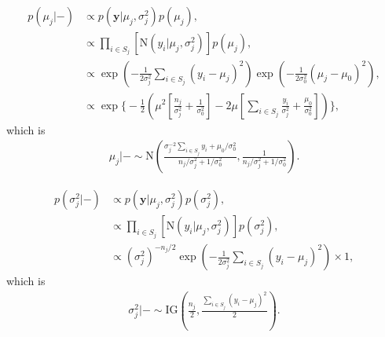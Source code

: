 \documentclass{article}
\begin{document}
\begin{align}
    p(\mu_{j}| - ) & \propto p(\textbf{y}| \mu_{j}, \sigma^{2}_{j}) p(\mu_{j}), \nonumber \\
    & \propto  \prod_{i \in S_{j}} \left[ \mbox{N}(y_{i}|\mu_{j}, \sigma^{2}_{j}) \right] p(\mu_{j}), \nonumber \\
    & \propto \exp \left( - \frac{1}{2\sigma^{2}_{j}} \sum_{i \in S_{j}} (y_{i} - \mu_{j})^{2}  \right) \exp \left( - \frac{1}{2 \sigma^{2}_{0}} (\mu_{j} - \mu_{0})^{2}  \right) , \nonumber \\
    & \propto \exp \Bigg\{ - \frac{1}{2} \left( \mu^{2} \left[ \frac{n_{j}}{\sigma^{2}_{j}} + \frac{1}{\sigma^{2}_{0}} \right] - 2\mu \left[ \sum_{i \in S_{j}} \frac{y_{i}}{\sigma^{2}_{j}} + \frac{\mu_{0}}{\sigma^{2}_{0}} \right] \right) \Bigg\}, \nonumber
\end{align}
which is
\begin{align}
    \mu_{j}|- \sim \mbox{N}\left( \frac{\sigma^{-2}_{j} \sum_{i \in S_{j}} y_{i} + \mu_{0}/\sigma^{2}_{0}}{n_{j}/\sigma^{2}_{j} +1/\sigma^{2}_{0}} , \frac{1}{n_{j}/\sigma^{2}_{j} +1/\sigma^{2}_{0}} \right).
\end{align}

\begin{align}
    p(\sigma^{2}_{j}| - ) & \propto p(\textbf{y}| \mu_{j}, \sigma^{2}_{j}) p(\sigma^{2}_{j}), \nonumber \\
    & \propto  \prod_{i \in S_{j}} \left[ \mbox{N}(y_{i}|\mu_{j}, \sigma^{2}_{j}) \right] p(\sigma^{2}_{j}), \nonumber \\
    & \propto (\sigma^{2}_{j})^{-n_{j}/2} \exp \left( - \frac{1}{2\sigma^{2}_{j}} \sum_{i \in S_{j}} (y_{i} - \mu_{j})^{2}  \right) \times 1 , \nonumber
\end{align}
which is
\begin{align}
    \sigma^{2}_{j}|- \sim \mbox{IG}\left( \frac{n_{j}}{2}, \frac{\sum_{i \in S_{j}} (y_{i} - \mu_{j})^{2}}{2} \right).
\end{align}
\end{document}
